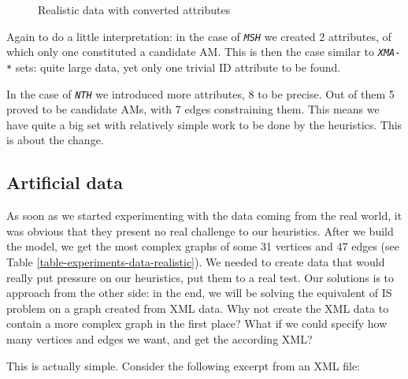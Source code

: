 \documentclass[a4paper,12pt,oneside]{report}
\newcommand{\jmodule}[1]{\texttt{\textit{#1}}}
\theoremstyle{definition}
\begin{document}
\begin{figure}
  \caption{Realistic data with converted attributes}
  \label{image-experiments-data-converted}
  \centering
\end{figure}

Again to do a little interpretation: in the case of \jmodule{MSH} we created 2 attributes, of which only one constituted a candidate AM. This is then the case similar to \jmodule{XMA-*} sets: quite large data, yet only one trivial ID attribute to be found.

In the case of \jmodule{NTH} we introduced more attributes, 8 to be precise. Out of them 5 proved to be candidate AMs, with 7 edges constraining them. This means we have quite a big set with relatively simple work to be done by the heuristics. This is about the change.

\subsection{Artificial data}

As soon as we started experimenting with the data coming from the real world, it was obvious that they present no real challenge to our heuristics. After we build the model, we get the most complex graphs of some 31 vertices and 47 edges (see Table \ref{table-experiments-data-realistic}). We needed to create data that would really put pressure on our heuristics, put them to a real test. Our solutions is to approach from the other side: in the end, we will be solving the equivalent of IS problem on a graph created from XML data. Why not create the XML data to contain a more complex graph in the first place? What if we could specify how many vertices and edges we want, and get the according XML?

This is actually simple. Consider the following excerpt from an XML file:
\end{document}
